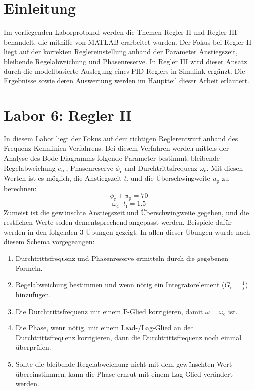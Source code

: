 \documentclass[11pt,a4paper]{article}
\begin{document}
\section{Einleitung}
Im vorliegenden Laborprotokoll werden die Themen Regler II und Regler III behandelt, die mithilfe von MATLAB erarbeitet wurden. Der Fokus bei Regler II liegt auf der korrekten Reglereinstellung anhand der Parameter Anstiegszeit, bleibende Regelabweichung und Phasenreserve. In Regler III wird dieser Ansatz durch die modellbasierte Auslegung eines PID-Reglers in Simulink ergänzt. Die Ergebnisse sowie deren Auswertung werden im Hauptteil dieser Arbeit erläutert.

\newpage

\section{Labor 6: Regler II}
In diesem Labor liegt der Fokus auf dem richtigen Reglerentwurf anhand des Frequenz-Kennlinien Verfahrens. Bei diesem Verfahren werden mittels der Analyse des Bode Diagramms folgende Parameter bestimmt: bleibende Regelabweichung $e_{\mathrm{\infty}}$, Phasenreserve $\phi_{\mathrm{r}}$ und Durchtrittsfrequenz $\omega_{\mathrm{c}}$. Mit diesen Werten ist es möglich, die Anstiegszeit $t_{\mathrm{r}}$ und die Überschwingweite $u_{\mathrm{p}}$ zu berechnen: 
$$ \phi_{\mathrm{r}} + u_{\mathrm{p}} = 70 $$
$$ \omega_{\mathrm{c}} \cdot t_{\mathrm{r}} = 1.5 $$
Zumeist ist die gewünschte Anstiegszeit und Überschwingweite gegeben, und die restlichen Werte sollen dementsprechend angepasst werden. Beispiele dafür werden in den folgenden 3 Übungen gezeigt. In allen dieser Übungen wurde nach diesem Schema vorgegeangen:
\begin{enumerate}
    \item Durchtrittsfrequenz und Phasenreserve ermitteln durch die gegebenen Formeln.
    \item Regelabweichung bestimmen und wenn nötig ein Integratorelement ($G_{\mathrm{r}} = \frac{1}{s}$) hinzufügen.
    \item Die Durchtrittsfrequenz mit einem P-Glied korrigieren, damit $\omega = \omega_{\mathrm{c}}$ ist.
    \item Die Phase, wenn nötig, mit einem Lead-/Lag-Glied an der Durchtrittsfrequenz korrigieren, dann die Durchtrittsfrequenz noch einmal überprüfen.
    \item Sollte die bleibende Regelabweichung nicht mit dem gewünschten Wert übereinstimmen, kann die Phase erneut mit einem Lag-Glied verändert werden.
\end{enumerate}
\end{document}
